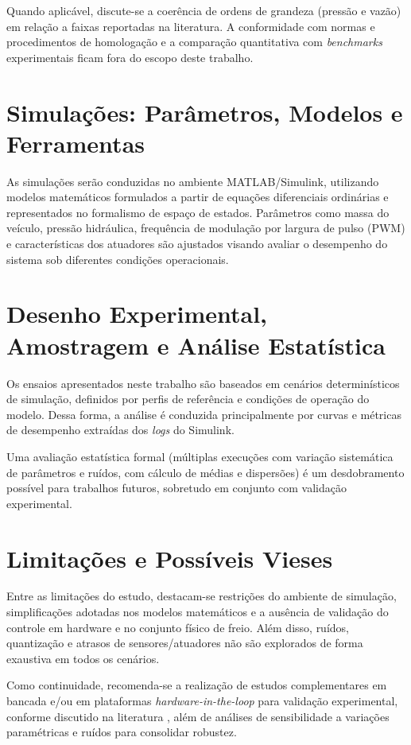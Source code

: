 Quando aplicável, discute-se a coerência de ordens de grandeza (pressão e vazão) em relação a faixas reportadas na literatura. A conformidade com normas e procedimentos de homologação e a comparação quantitativa com \emph{benchmarks} experimentais ficam fora do escopo deste trabalho.

\section{Simulações: Parâmetros, Modelos e Ferramentas}
\label{sec:metodologia-10}
As simulações serão conduzidas no ambiente MATLAB/Simulink, utilizando modelos matemáticos formulados a partir de equações diferenciais ordinárias e representados no formalismo de espaço de estados. Parâmetros como massa do veículo, pressão hidráulica, frequência de modulação por largura de pulso (PWM) e características dos atuadores são ajustados visando avaliar o desempenho do sistema sob diferentes condições operacionais.

\section{Desenho Experimental, Amostragem e Análise Estatística}
\label{sec:metodologia-11}
Os ensaios apresentados neste trabalho são baseados em cenários determinísticos de simulação, definidos por perfis de referência e condições de operação do modelo. Dessa forma, a análise é conduzida principalmente por curvas e métricas de desempenho extraídas dos \emph{logs} do Simulink.

Uma avaliação estatística formal (múltiplas execuções com variação sistemática de parâmetros e ruídos, com cálculo de médias e dispersões) é um desdobramento possível para trabalhos futuros, sobretudo em conjunto com validação experimental.

\section{Limitações e Possíveis Vieses}
\label{sec:metodologia-12}
Entre as limitações do estudo, destacam-se restrições do ambiente de simulação, simplificações adotadas nos modelos matemáticos e a ausência de validação do controle em hardware e no conjunto físico de freio. Além disso, ruídos, quantização e atrasos de sensores/atuadores não são explorados de forma exaustiva em todos os cenários.

Como continuidade, recomenda-se a realização de estudos complementares em bancada e/ou em plataformas \textit{hardware-in-the-loop} para validação experimental, conforme discutido na literatura , além de análises de sensibilidade a variações paramétricas e ruídos para consolidar robustez.